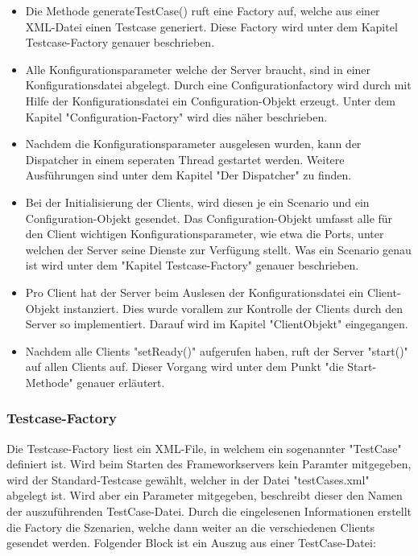 \begin{itemize}
\item Die Methode generateTestCase() ruft eine Factory auf, welche aus einer XML-Datei einen Testcase generiert. Diese Factory wird unter dem Kapitel Testcase-Factory genauer beschrieben.
\item Alle Konfigurationsparameter welche der Server braucht, sind in einer Konfigurationsdatei abgelegt. Durch eine Configurationfactory wird durch mit Hilfe der Konfigurationsdatei ein Configuration-Objekt erzeugt. Unter dem Kapitel "Configuration-Factory" wird dies näher beschrieben.
\item Nachdem die Konfigurationsparameter ausgelesen wurden, kann der Dispatcher in einem seperaten Thread gestartet werden. Weitere Ausführungen sind unter dem Kapitel "Der Dispatcher" zu finden.
\item Bei der Initialisierung der Clients, wird diesen je ein Scenario und ein Configuration-Objekt gesendet. Das Configuration-Objekt umfasst alle für den Client wichtigen Konfigurationsparameter, wie etwa die Ports, unter welchen der Server seine Dienste zur Verfügung stellt. Was ein Scenario genau ist wird unter dem "Kapitel Testcase-Factory" genauer beschrieben.
\item Pro Client hat der Server beim Auslesen der Konfigurationsdatei ein Client-Objekt instanziert. Dies wurde vorallem zur Kontrolle der Clients durch den Server so implementiert. Darauf wird im Kapitel "ClientObjekt" eingegangen.
\item Nachdem alle Clients "setReady()" aufgerufen haben, ruft der Server "start()" auf allen Clients auf. Dieser Vorgang wird unter dem Punkt "die Start-Methode" genauer erläutert.
\end{itemize}

\subsubsection{Testcase-Factory}
\label{sec:testCaseFactory}
Die Testcase-Factory liest ein XML-File, in welchem ein sogenannter "TestCase" definiert ist. Wird beim Starten des Frameworkservers kein Paramter mitgegeben, wird der Standard-Testcase gewählt, welcher in der Datei "testCases.xml" abgelegt ist. Wird aber ein Parameter mitgegeben, beschreibt dieser den Namen der auszuführenden TestCase-Datei.\newline
Durch die eingelesenen Informationen erstellt die Factory die Szenarien, welche dann weiter an die verschiedenen Clients gesendet werden. Folgender Block ist ein Auszug aus einer TestCase-Datei:

